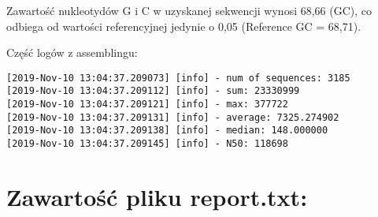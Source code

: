 \documentclass[a4paper]{article}
\begin{document}
Zawartość nukleotydów G i C w uzyskanej sekwencji wynosi 68,66 (GC), co odbiega od wartości referencyjnej jedynie o 0,05 (Reference GC = 68,71).

Część logów z assemblingu:
\begin{verbatim}
[2019-Nov-10 13:04:37.209073] [info] - num of sequences: 3185
[2019-Nov-10 13:04:37.209112] [info] - sum: 23330999
[2019-Nov-10 13:04:37.209121] [info] - max: 377722
[2019-Nov-10 13:04:37.209131] [info] - average: 7325.274902
[2019-Nov-10 13:04:37.209138] [info] - median: 148.000000
[2019-Nov-10 13:04:37.209145] [info] - N50: 118698
\end{verbatim}

\section {Zawartość pliku report.txt:}
\end{document}
